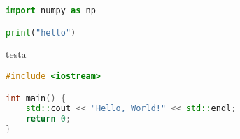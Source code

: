 \begin{lstlisting}[language=Python]
import numpy as np

print("hello")
\end{lstlisting}
testa
\begin{lstlisting}[language=C++]
#include <iostream>

int main() {
    std::cout << "Hello, World!" << std::endl;
    return 0;
}
\end{lstlisting}

